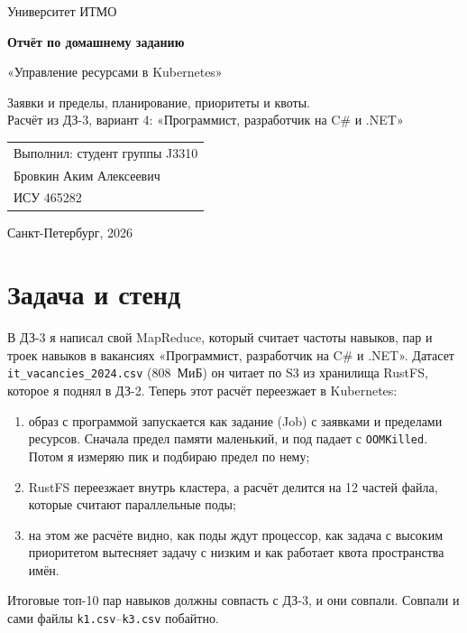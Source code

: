 \documentclass[11pt,a4paper]{article}
\newcommand{\studentName}{Бровкин Аким Алексеевич}
\newcommand{\studentGroup}{J3310}
\newcommand{\studentIsu}{465282}
\begin{document}
\begin{titlepage}
\centering
{\large Университет ИТМО\par}
\vspace{4.5cm}
{\LARGE\bfseries Отчёт по домашнему заданию\par}
\vspace{0.6cm}
{\Large «Управление ресурсами в Kubernetes»\par}
\vspace{0.6cm}
{\normalsize Заявки и пределы, планирование, приоритеты и квоты.\\Расчёт из ДЗ-3, вариант 4: «Программист, разработчик на C\# и .NET»\par}
\vfill
\begin{flushright}
\begin{tabular}{@{}l@{}}
Выполнил: студент группы \studentGroup\\
\studentName\\
ИСУ \studentIsu\\[1.2em]
\end{tabular}
\end{flushright}
\vspace{2cm}
{Санкт-Петербург, 2026\par}
\end{titlepage}

\newpage
\tableofcontents
\newpage

\section{Задача и стенд}

В ДЗ-3 я написал свой MapReduce, который считает частоты навыков, пар и троек навыков в вакансиях «Программист, разработчик на C\# и .NET». Датасет \texttt{it\_vacancies\_2024.csv} (808~МиБ) он читает по S3 из хранилища RustFS, которое я поднял в ДЗ-2. Теперь этот расчёт переезжает в Kubernetes:
\begin{enumerate}
  \item образ с программой запускается как задание (Job) с заявками и пределами ресурсов. Сначала предел памяти маленький, и под падает с \texttt{OOMKilled}. Потом я измеряю пик и подбираю предел по нему;
  \item RustFS переезжает внутрь кластера, а расчёт делится на 12 частей файла, которые считают параллельные поды;
  \item на этом же расчёте видно, как поды ждут процессор, как задача с высоким приоритетом вытесняет задачу с низким и как работает квота пространства имён.
\end{enumerate}
Итоговые топ-10 пар навыков должны совпасть с ДЗ-3, и они совпали. Совпали и сами файлы \texttt{k1.csv}--\texttt{k3.csv} побайтно.
\end{document}
